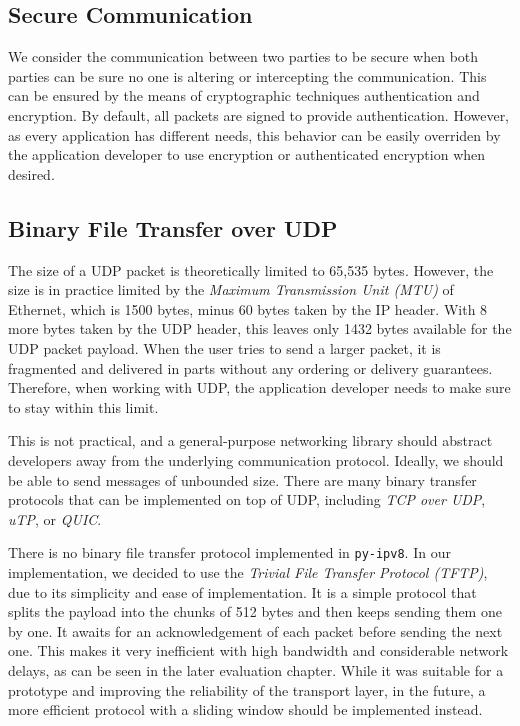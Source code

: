 \subsection{Secure Communication}

We consider the communication between two parties to be secure when both parties can be sure no one is altering or intercepting the communication. This can be ensured by the means of cryptographic techniques authentication and encryption. By default, all packets are signed to provide authentication. However, as every application has different needs, this behavior can be easily overriden by the application developer to use encryption or authenticated encryption when desired.

\subsection{Binary File Transfer over UDP}

The size of a UDP packet is theoretically limited to 65,535 bytes. However, the size is in practice limited by the \textit{Maximum Transmission Unit (MTU)} of Ethernet, which is 1500 bytes, minus 60 bytes taken by the IP header. With 8 more bytes taken by the UDP header, this leaves only 1432 bytes available for the UDP packet payload. When the user tries to send a larger packet, it is fragmented and delivered in parts without any ordering or delivery guarantees. Therefore, when working with UDP, the application developer needs to make sure to stay within this limit.

This is not practical, and a general-purpose networking library should abstract developers away from the underlying communication protocol. Ideally, we should be able to send messages of unbounded size. There are many binary transfer protocols that can be implemented on top of UDP, including \textit{TCP over UDP}, \textit{uTP}, or \textit{QUIC}.

There is no binary file transfer protocol implemented in \texttt{py-ipv8}. In our implementation, we decided to use the \textit{Trivial File Transfer Protocol (TFTP)}, due to its simplicity and ease of implementation. It is a simple protocol that splits the payload into the chunks of 512 bytes and then keeps sending them one by one. It awaits for an acknowledgement of each packet before sending the next one. This makes it very inefficient with high bandwidth and considerable network delays, as can be seen in the later evaluation chapter. While it was suitable for a prototype and improving the reliability of the transport layer, in the future, a more efficient protocol with a sliding window should be implemented instead.

